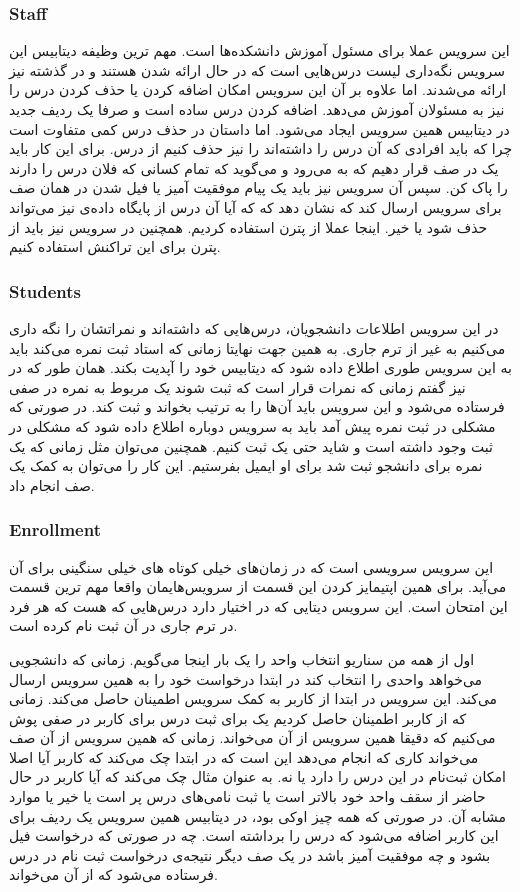 \subsubsection{Staff}
این سرویس عملا برای مسئول آموزش دانشکده‌ها است. مهم ترین وظیفه دیتابیس این سرویس نگه‌داری
لیست درس‌هایی است که در حال ارائه شدن هستند و در گذشته نیز ارائه می‌شدند. اما علاوه بر آن این سرویس
امکان اضافه کردن یا حذف کردن درس را نیز به مسئولان آموزش می‌دهد. اضافه کردن درس ساده است و
صرفا یک ردیف جدید در دیتابیس همین سرویس ایجاد می‌شود. اما داستان در حذف درس کمی متفاوت است چرا
که باید افرادی که آن درس را داشته‌اند را نیز حذف کنیم از درس. برای این کار باید یک
در صف قرار دهیم که به
می‌رود و می‌گوید که تمام کسانی که فلان درس را دارند را پاک کن. سپس آن سرویس نیز باید یک پیام موفقیت آمیز
یا فیل شدن در همان صف برای سرویس
ارسال کند که نشان دهد که که آیا آن درس از پایگاه داده‌ی
نیز می‌تواند حذف شود یا خیر. اینجا عملا از پترن
استفاده کردیم. همچنین در سرویس
نیز باید از پترن
برای این تراکنش استفاده کنیم.
\subsubsection{Students}
در این سرویس اطلاعات دانشجویان، درس‌هایی که داشته‌اند و نمراتشان را نگه داری می‌کنیم به غیر از ترم جاری.
به همین جهت نهایتا زمانی که استاد ثبت نمره می‌کند باید به این سرویس طوری اطلاع داده شود که دیتابیس خود را
آپدیت بکند. همان طور که در
نیز گفتم زمانی که نمرات قرار است که ثبت شوند یک
مربوط به نمره در صفی فرستاده می‌شود و این سرویس باید آن‌ها را به ترتیب بخواند و ثبت کند. در صورتی که
مشکلی در ثبت نمره پیش آمد باید به سرویس
دوباره اطلاع داده شود که مشکلی در ثبت وجود داشته است و شاید حتی یک
ثبت کنیم. همچنین می‌توان مثل
زمانی که یک نمره برای دانشجو ثبت شد برای او ایمیل بفرستیم. این کار را می‌توان به کمک یک صف انجام داد.
\subsubsection{Enrollment}
این سرویس سرویسی است که در زمان‌های خیلی کوتاه
های
خیلی سنگینی برای آن می‌آید. برای همین اپتیمایز کردن این قسمت از سرویس‌هایمان واقعا مهم ترین قسمت این امتحان است.
این سرویس دیتایی که در اختیار دارد درس‌هایی که هست که هر فرد در ترم جاری در آن ثبت نام کرده است.

اول از همه من سناریو انتخاب واحد را یک بار اینجا می‌گویم. زمانی که دانشجویی می‌خواهد واحدی را انتخاب کند
در ابتدا درخواست خود را به همین سرویس ارسال می‌کند. این سرویس در ابتدا از
کاربر به کمک سرویس
اطمینان حاصل می‌کند. زمانی که از کاربر اطمینان حاصل کردیم یک
برای ثبت درس برای کاربر در صفی پوش می‌کنیم که دقیقا همین سرویس از آن می‌خواند. زمانی که همین سرویس
از آن صف می‌خواند کاری که انجام می‌دهد این است که در ابتدا چک می‌کند که کاربر آیا اصلا امکان ثبت‌نام
در این درس را دارد یا نه. به عنوان مثال چک می‌کند که آیا کاربر در حال حاضر از سقف واحد خود بالاتر است یا ثبت نامی‌های درس پر است یا
خیر یا موارد مشابه آن. در صورتی که همه چیز اوکی بود،‌ در دیتابیس همین سرویس یک ردیف
برای این کاربر اضافه می‌شود که درس را برداشته است. چه در صورتی که درخواست فیل بشود و چه موفقیت آمیز باشد
در یک صف دیگر نتیجه‌ی درخواست ثبت نام در درس فرستاده می‌شود که
از آن می‌خواند.
